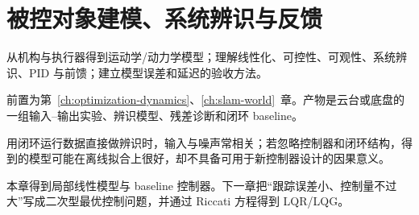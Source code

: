 \chapter{被控对象建模、系统辨识与反馈}
\label{ch:modeling-feedback}

\begin{learningobjectives}
从机构与执行器得到运动学/动力学模型；理解线性化、可控性、可观性、系统辨识、PID 与前馈；建立模型误差和延迟的验收方法。
\end{learningobjectives}

\begin{prerequisites}
前置为第~\ref{ch:optimization-dynamics}、\ref{ch:slam-world}~章。产物是云台或底盘的一组输入--输出实验、辨识模型、残差诊断和闭环 baseline。
\end{prerequisites}


\begin{failuremode}
用闭环运行数据直接做辨识时，输入与噪声常相关；若忽略控制器和闭环结构，得到的模型可能在离线拟合上很好，却不具备可用于新控制器设计的因果意义。
\end{failuremode}

\begin{chaptertransition}
本章得到局部线性模型与 baseline 控制器。下一章把“跟踪误差小、控制量不过大”写成二次型最优控制问题，并通过 Riccati 方程得到 LQR/LQG。
\end{chaptertransition}

